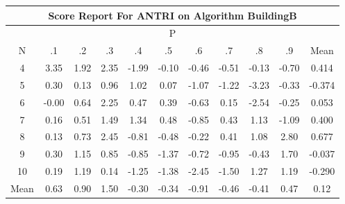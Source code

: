 \documentclass[11pt,a4paper]{report}
\begin{document}
\begin{longtable}{ | c || c | c | c | c | c | c | c | c | c || c |}
\hline
\multicolumn{11}{|c|}{ Score Report For ANTRI on Algorithm BuildingB} \\
\hline
\multicolumn{11}{|c|}{ P } \\
\hline
N & .1 & .2 & .3 & .4 & .5 & .6 & .7 & .8 & .9 & Mean\\
 \hline
 \hline
 \endhead
  4 &  \cellcolor[HTML]{A7A7FF} 3.35 &  \cellcolor[HTML]{CFCFFF} 1.92 &  \cellcolor[HTML]{C7C7FF} 2.35 &  \cellcolor[HTML]{FFCFCF} -1.99 &  \cellcolor[HTML]{FFFFFF} -0.10 &  \cellcolor[HTML]{FFF7F7} -0.46 &  \cellcolor[HTML]{FFEFEF} -0.51 &  \cellcolor[HTML]{FFFFFF} -0.13 &  \cellcolor[HTML]{FFEFEF} -0.70 & 0.414 \\
  5 &  \cellcolor[HTML]{F7F7FF} 0.30 &  \cellcolor[HTML]{FFFFFF} 0.13 &  \cellcolor[HTML]{E7E7FF} 0.96 &  \cellcolor[HTML]{E7E7FF} 1.02 &  \cellcolor[HTML]{FFFFFF} 0.07 &  \cellcolor[HTML]{FFE7E7} -1.07 &  \cellcolor[HTML]{FFDFDF} -1.22 &  \cellcolor[HTML]{FFAFAF} -3.23 &  \cellcolor[HTML]{FFF7F7} -0.33 & -0.374 \\
  6 &  \cellcolor[HTML]{FFFFFF} -0.00 &  \cellcolor[HTML]{EFEFFF} 0.64 &  \cellcolor[HTML]{C7C7FF} 2.25 &  \cellcolor[HTML]{F7F7FF} 0.47 &  \cellcolor[HTML]{F7F7FF} 0.39 &  \cellcolor[HTML]{FFEFEF} -0.63 &  \cellcolor[HTML]{FFFFFF} 0.15 &  \cellcolor[HTML]{FFBFBF} -2.54 &  \cellcolor[HTML]{FFF7F7} -0.25 & 0.053 \\
  7 &  \cellcolor[HTML]{FFFFFF} 0.16 &  \cellcolor[HTML]{EFEFFF} 0.51 &  \cellcolor[HTML]{D7D7FF} 1.49 &  \cellcolor[HTML]{DFDFFF} 1.34 &  \cellcolor[HTML]{EFEFFF} 0.48 &  \cellcolor[HTML]{FFE7E7} -0.85 &  \cellcolor[HTML]{F7F7FF} 0.43 &  \cellcolor[HTML]{DFDFFF} 1.13 &  \cellcolor[HTML]{FFE7E7} -1.09 & 0.400 \\
  8 &  \cellcolor[HTML]{FFFFFF} 0.13 &  \cellcolor[HTML]{EFEFFF} 0.73 &  \cellcolor[HTML]{BFBFFF} 2.45 &  \cellcolor[HTML]{FFE7E7} -0.81 &  \cellcolor[HTML]{FFF7F7} -0.48 &  \cellcolor[HTML]{FFF7F7} -0.22 &  \cellcolor[HTML]{F7F7FF} 0.41 &  \cellcolor[HTML]{E7E7FF} 1.08 &  \cellcolor[HTML]{B7B7FF} 2.80 & 0.677 \\
  9 &  \cellcolor[HTML]{F7F7FF} 0.30 &  \cellcolor[HTML]{DFDFFF} 1.15 &  \cellcolor[HTML]{E7E7FF} 0.85 &  \cellcolor[HTML]{FFE7E7} -0.85 &  \cellcolor[HTML]{FFDFDF} -1.37 &  \cellcolor[HTML]{FFEFEF} -0.72 &  \cellcolor[HTML]{FFE7E7} -0.95 &  \cellcolor[HTML]{FFF7F7} -0.43 &  \cellcolor[HTML]{D7D7FF} 1.70 & -0.037 \\
  10 &  \cellcolor[HTML]{F7F7FF} 0.19 &  \cellcolor[HTML]{DFDFFF} 1.19 &  \cellcolor[HTML]{FFFFFF} 0.14 &  \cellcolor[HTML]{FFDFDF} -1.25 &  \cellcolor[HTML]{FFDFDF} -1.38 &  \cellcolor[HTML]{FFBFBF} -2.45 &  \cellcolor[HTML]{FFD7D7} -1.50 &  \cellcolor[HTML]{DFDFFF} 1.27 &  \cellcolor[HTML]{DFDFFF} 1.19 & -0.290 \\
 \hline
 \hline
Mean &  \cellcolor[HTML]{EFEFFF} 0.63 &  \cellcolor[HTML]{E7E7FF} 0.90 &  \cellcolor[HTML]{D7D7FF} 1.50 &  \cellcolor[HTML]{FFF7F7} -0.30 &  \cellcolor[HTML]{FFF7F7} -0.34 &  \cellcolor[HTML]{FFE7E7} -0.91 &  \cellcolor[HTML]{FFF7F7} -0.46 &  \cellcolor[HTML]{FFF7F7} -0.41 &  \cellcolor[HTML]{F7F7FF} 0.47 &  \cellcolor[HTML]{FFFFFF} 0.12
\end{longtable}
\end{document}

